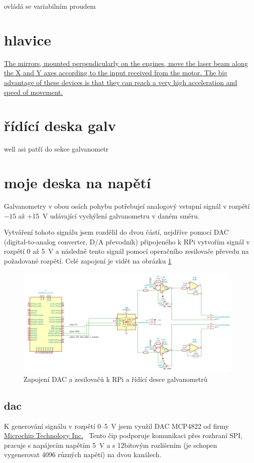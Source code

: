 \documentclass{template/socthesis}
\begin{document}
ovládá se variabilním proudem

\section{hlavice}
\href{https://elenlaser.com/blog/galvo-head-laser-focus-tool.html}{The mirrors, mounted perpendicularly on the engines, move the laser beam along the X and Y axes according to the input received from the motor.
  The big advantage of these devices is that they can reach a very high acceleration and speed of movement.}
\section{řídící deska galv}
well asi patří do sekce galvanometr

\section{moje deska na napětí}
Galvanometry v obou osách pohybu potřebujeí analogový vstupní signál v rozpětí $-15$ až +15~V udávající vychýlení galvanometru v daném směru.

Vytváření tohoto signálu jsem rozdělil do dvou částí, nejdříve pomocí DAC (digital-to-analog converter, D/A převodník) připojeného k RPi vytvořím signál v rozpětí 0 až 5~V a následně tento signál pomocí operačního zesilovače převedu na požadované rozpětí.
Celé zapojení je vidět na obrázku \ref{fig:dac_board}
\begin{figure}[!htb]
  \centering
  \includegraphics[width=1\textwidth]{img/dac_board.png} %
  \caption{\label{fig:dac_board}Zapojení DAC a zesilovačů k RPi a řídící desce galvanometrů}
\end{figure}

\subsection{dac}
K generování signálu v rozpětí 0--5~V jsem využil DAC MCP4822 od firmy \href{https://www.microchip.com}{Microchip Technology Inc.}\ 
Tento čip podporuje komunikaci přes rozhraní SPI, pracuje s napájecím napětím 5~V a s 12bitovým rozlišením (je schopen vygenerovat 4096 různých napětí) na dvou kanálech.
\end{document}

